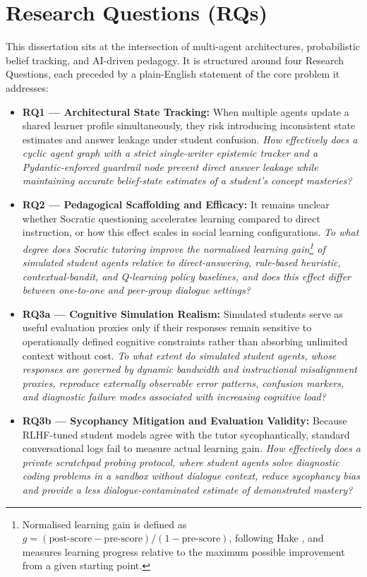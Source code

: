 \documentclass[11pt,a4paper]{report}
\begin{document}
\section{Research Questions (RQs)}
This dissertation sits at the intersection of multi-agent architectures, probabilistic belief tracking, and AI-driven pedagogy. It is structured around four Research Questions, each preceded by a plain-English statement of the core problem it addresses:
\begin{itemize}
    \item \textbf{RQ1 — Architectural State Tracking:}
    When multiple agents update a shared learner profile simultaneously, they risk introducing inconsistent state estimates and answer leakage under student confusion.
    \textit{How effectively does a cyclic agent graph with a strict single-writer epistemic tracker and a Pydantic-enforced guardrail node prevent direct answer leakage while maintaining accurate belief-state estimates of a student's concept masteries?}

    \item \textbf{RQ2 — Pedagogical Scaffolding and Efficacy:}
    It remains unclear whether Socratic questioning accelerates learning compared to direct instruction, or how this effect scales in social learning configurations.
    \textit{To what degree does Socratic tutoring improve the normalised learning gain\footnote{Normalised learning gain is defined as $g = (\text{post-score} - \text{pre-score}) / (1 - \text{pre-score})$, following Hake \cite{hake1998interactive}, and measures learning progress relative to the maximum possible improvement from a given starting point.} of simulated student agents relative to direct-answering, rule-based heuristic, contextual-bandit, and Q-learning policy baselines, and does this effect differ between one-to-one and peer-group dialogue settings?}

    \item \textbf{RQ3a — Cognitive Simulation Realism:}
    Simulated students serve as useful evaluation proxies only if their responses remain sensitive to operationally defined cognitive constraints rather than absorbing unlimited context without cost.
    \textit{To what extent do simulated student agents, whose responses are governed by dynamic bandwidth and instructional misalignment proxies, reproduce externally observable error patterns, confusion markers, and diagnostic failure modes associated with increasing cognitive load?}

    \item \textbf{RQ3b — Sycophancy Mitigation and Evaluation Validity:}
    Because RLHF-tuned student models agree with the tutor sycophantically, standard conversational logs fail to measure actual learning gain.
    \textit{How effectively does a private scratchpad probing protocol, where student agents solve diagnostic coding problems in a sandbox without dialogue context, reduce sycophancy bias and provide a less dialogue-contaminated estimate of demonstrated mastery?}
\end{itemize}
\end{document}
